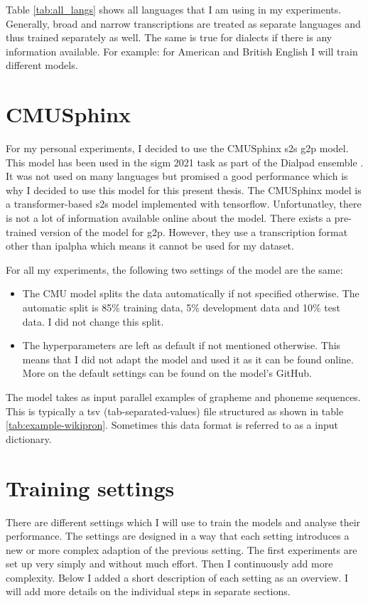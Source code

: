 Table \ref{tab:all_langs} shows all languages that I am using in my experiments. Generally, broad and narrow transcriptions are treated as separate languages and thus trained separately as well. The same is true for dialects if there is any information available. For example: for American and British English I will train different models. 

\section{CMUSphinx}
\label{sec:cmu}
For my personal experiments, I decided to use the CMUSphinx \ac{s2s} \ac{g2p} model. This model has been used in the \ac{sigm} 2021 task as part of the Dialpad ensemble \citep{gautam.2021}. It was not used on many languages but promised a good performance which is why I decided to use this model for this present thesis. The CMUSphinx model is a transformer-based \ac{s2s} model implemented with tensorflow. Unfortunatley, there is not a lot of information available online about the model. There exists a pre-trained version of the model for \ac{g2p}. However, they use a transcription format other than \ac{ipalpha} which means it cannot be used for my dataset. 

For all my experiments, the following two settings of the model are the same:
\begin{itemize}
\item The CMU model splits the data automatically if not specified otherwise. The automatic split is 85\% training data, 5\% development data and 10\% test data. I did not change this split.
\item The hyperparameters are left as default if not mentioned otherwise. This means that I did not adapt the model and used it as it can be found online. More on the default settings can be found on the model's GitHub.
\end{itemize}

The model takes as input parallel examples of grapheme and phoneme sequences. This is typically a tsv (tab-separated-values) file structured as shown in table \ref{tab:example-wikipron}. Sometimes this data format is referred to as a input dictionary.

\section{Training settings}
\label{sec:train-settings}
There are different settings which I will use to train the models and analyse their performance. The settings are designed in a way that each setting introduces a new or more complex adaption of the previous setting. The first experiments are set up very simply and without much effort. Then I continuously add more complexity. Below I added a short description of each setting as an overview. I will add more details on the individual steps in separate sections. 

